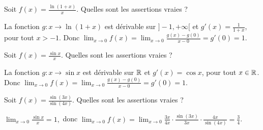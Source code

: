 \begin{question} 
Soit $f(x)= \frac{\ln(1+x)}{x}$. Quelles sont les assertions vraies ?
\begin{answers}

    
    
    
    
\end{answers}
\begin{explanations}
La fonction $g: x\to \ln(1+x)$ est dérivable sur $]-1,+\infty[$  et $g'(x)= \frac{1}{1+x}$, pour tout $x>-1$. Donc  $\lim_{x\to 0}f(x)= \lim_{x\to 0}\frac{g(x)-g(0)}{x-0} = g'(0)=1$.
\end{explanations}

\end{question}


\begin{question} 
Soit $f(x)= \frac{\sin x}{x}$. Quelles sont les assertions vraies ?
\begin{answers}

    
    
    
    
  
\end{answers}
\begin{explanations}
La fonction $g: x\to \sin x$ est dérivable sur $\mathbb{R}$  et $g'(x)= \cos x$, pour tout $x\in \mathbb{R}$. Donc  $\lim_{x\to 0}f(x)= \lim_{x\to 0}\frac{g(x)-g(0)}{x-0} = g'(0)=1$.
\end{explanations}

\end{question}



\begin{question} 
Soit $f(x)= \frac{\sin(3x)}{\sin(4x)}$. Quelles sont les assertions vraies ?
\begin{answers}

    
    
    
    

 
\end{answers}
\begin{explanations}
$\lim_{x\to 0}\frac{\sin x}{x} = 1,$ donc $\lim_{x\to 0} f(x)= \lim_{x\to 0}\frac{3x}{4x} \cdot  \frac{\sin (3x)}{3x}\cdot  \frac{4x}{\sin(4x)} = \frac{3}{4}$.
\end{explanations}

\end{question}




